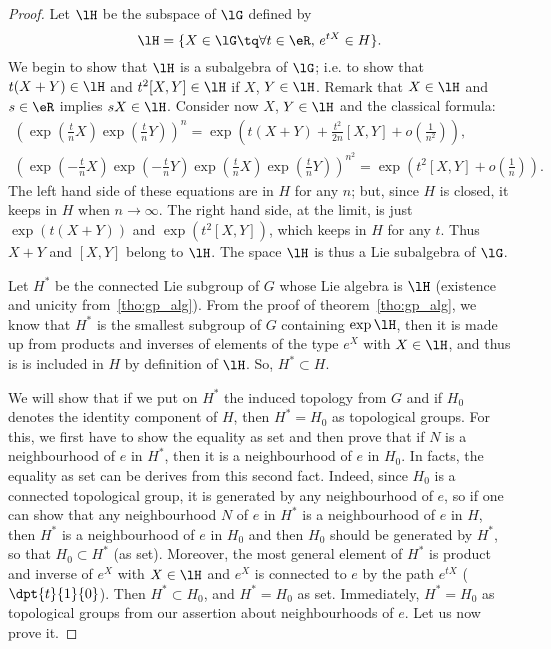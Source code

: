 \begin{proof}
   Let $\lH$ be the subspace of $\lG$ defined by
\begin{equation}\label{eq:lH_de_G}
  \lH=\{X\in\lG\tq \forall t\in\eR,\, e^{tX}\in H\}.
\end{equation}
We begin to show that $\lH$ is a subalgebra of $\lG$; i.e. to show that $t(X+Y)\in\lH$ and $t^2[X,Y]\in\lH$ if $X$, $Y\in\lH$. Remark that $X\in\lH$ and $s\in\eR$ implies $sX\in\lH$. Consider now $X$, $Y\in\lH$ and the classical formula:
\begin{subequations}        \label{SUBEQSooASPNooZOpKRt}
\begin{align}
\left(  \exp(\frac{t}{n}X)\exp(\frac{t}{n}Y)  \right )^n
                       =\exp( t(X+Y)+\frac{t^2}{2n}[X,Y]+o(\frac{1}{n^2}) ),\\
\left(  \exp(-\frac{t}{n}X)\exp(-\frac{t}{n}Y)\exp(\frac{t}{n}X)\exp(\frac{t}{n}Y)   \right)^{n^2}
                       =\exp\left( t^2[X,Y]+o(\frac{1}{n})\right).
\end{align}
\end{subequations}
The left hand side of these equations are in $H$ for any $n$; but, since $H$ is closed, it keeps in $H$ when $n\to\infty$. The right hand side, at the limit, is just $\exp(t(X+Y))$ and $\exp(t^2[X,Y])$, which keeps in $H$ for any $t$. Thus $X+Y$ and $[X,Y]$ belong to $\lH$. The space $\lH$ is thus a Lie subalgebra of $\lG$.

Let $H^*$ be the connected Lie subgroup of $G$ whose Lie algebra is $\lH$ (existence and unicity from~\ref{tho:gp_alg}). From the proof of theorem~\ref{tho:gp_alg}, we know that $H^*$ is the smallest subgroup of $G$ containing $\exp\lH$, then it is made up from products and inverses of elements of the type $e^X$ with $X\in\lH$, and thus is is included in $H$ by definition of $\lH$. So, $H^*\subset H$.

We will show that if we put on $H^*$ the induced topology from $G$ and if $H_0$ denotes the identity component of $H$, then $H^*=H_0$ as topological groups. For this, we first have to show the equality as set and then prove that if $N$ is a neighbourhood of $e$ in $H^*$, then it is a neighbourhood of $e$ in $H_0$. In facts, the equality as set can be derives from this second fact. Indeed, since $H_0$ is a connected topological group, it is generated by any neighbourhood of $e$, so if one can show that any neighbourhood $N$ of $e$ in $H^*$ is a neighbourhood of $e$ in $H$, then $H^*$ is a neighbourhood of $e$ in $H_0$ and then $H_0$ should be generated by $H^*$, so that $H_0\subset H^*$ (as set). Moreover, the most general element of $H^*$ is product and inverse of $e^X$ with $X\in\lH$ and $e^X$ is connected to $e$ by the path $e^{tX}$ ($\dpt{t}{1}{0}$). Then $H^*\subset H_0$, and $H^*=H_0$ as set. Immediately, $H^*=H_0$ as topological groups from our assertion about neighbourhoods of $e$. Let us now prove it.


\end{proof}
